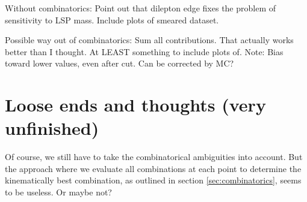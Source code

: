 \documentclass[twoside,english]{uiofysmaster}
\begin{document}
Without combinatorics: Point out that dilepton edge fixes the problem of sensitivity to LSP mass. Include plots of smeared dataset. 

Possible way out of combinatorics: Sum all contributions. That actually works better than I thought. At LEAST something to include plots of. Note: Bias toward lower values, even after cut. Can be corrected by MC? 





\clearpage
\section{Loose ends and thoughts (very unfinished)}

Of course, we still have to take the combinatorical ambiguities into account. But the approach where we evaluate all combinations at each point to determine the kinematically best combination, as outlined in section \ref{sec:combinatorics}, seems to be useless. Or maybe not?
\end{document}
